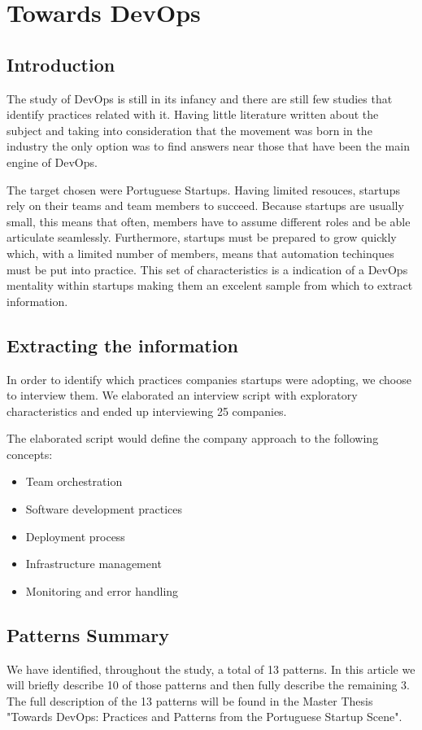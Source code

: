 \documentclass{llncs}
\begin{document}
\section{Towards DevOps}

	\subsection{Introduction}
		The study of DevOps is still in its infancy and there are still few studies that identify practices related with it. Having little literature written about the subject and taking into consideration that the movement was born in the industry the only option was to find answers near those that have been the main engine of DevOps.

    The target chosen were Portuguese Startups. Having limited resouces, startups rely on their teams and team members to succeed. Because startups are usually small, this means that often, members have to assume different roles and be able articulate seamlessly. Furthermore, startups must be prepared to grow quickly which, with a limited number of members, means that automation techinques must be put into practice. This set of characteristics is a indication of a DevOps mentality within startups making them an excelent sample from which to extract information.

  \subsection{Extracting the information}

  In order to identify which practices companies startups were adopting, we choose to interview them. We elaborated an interview script with exploratory characteristics and ended up interviewing 25 companies.

  The elaborated script would define the company approach to the following concepts:
  \begin{itemize}
    \item Team orchestration
    \item Software development practices
    \item Deployment process
    \item Infrastructure management
    \item Monitoring and error handling
  \end{itemize}

  \subsection{Patterns Summary}
  We have identified, throughout the study, a total of 13 patterns. In this article we will briefly describe 10 of those patterns and then fully describe the remaining 3.
  The full description of the 13 patterns will be found in the Master Thesis "Towards DevOps: Practices and Patterns from the Portuguese Startup Scene".
\end{document}
